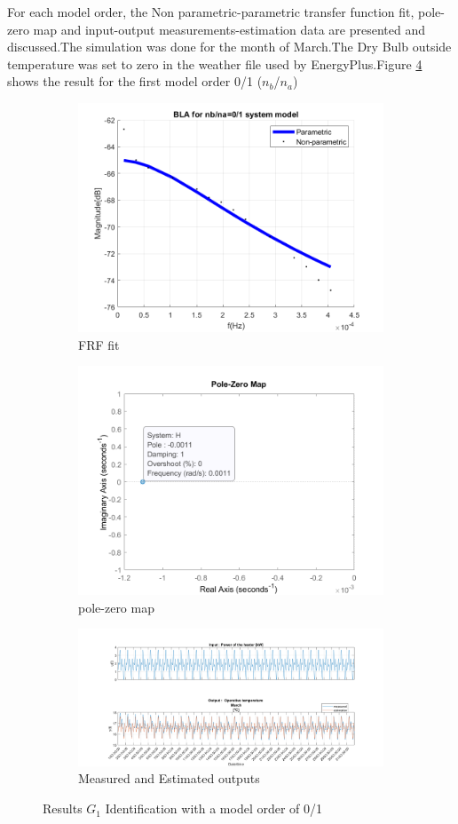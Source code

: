 \documentclass[a4paper,12pt]{report}
\numberwithin{equation}{section}
\begin{document}
\noindent
For each model order, the Non parametric-parametric transfer function fit, pole-zero map and input-output measurements-estimation data  are presented and discussed.The simulation was done for the month of March.The Dry Bulb outside temperature was set to zero in the weather file used by EnergyPlus.Figure \ref{fig:G1mod0/1} shows the result for the first model order 0/1 ($n_{b}$/$n_{a}$)

\begin{figure}[H]
\centering
\begin{subfigure}{\textwidth}
  \centering
  \includegraphics[width=.6\linewidth]{G1mod01FrfFit.png}
  \caption{FRF fit}
  \label{fig:frf fit G1mod0/1}
\end{subfigure}

\begin{subfigure}{\textwidth}
  \centering
  \includegraphics[width=.6\linewidth]{G1mod01pzmap.png}
  \caption{pole-zero map}
  \label{fig:pzmap G1mod0/1}
\end{subfigure}

\begin{subfigure}{\textwidth}
  \centering
  \includegraphics[scale=0.3]{G1mod01InOut.png}
  \caption{Measured and Estimated outputs}
  \label{fig:inoutG10/1}
\end{subfigure}
\caption{Results $G_{1}$ Identification with a model order of 0/1 }
\label{fig:G1mod0/1}
\end{figure}
\end{document}
